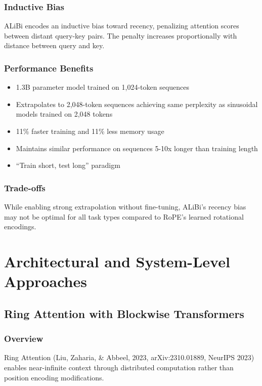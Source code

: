 \documentclass[11pt,letterpaper]{article}
\begin{document}
\subsubsection{Inductive Bias}
ALiBi encodes an inductive bias toward recency, penalizing attention scores between distant query-key pairs. The penalty increases proportionally with distance between query and key.

\subsubsection{Performance Benefits}
\begin{itemize}[leftmargin=*]
    \item 1.3B parameter model trained on 1,024-token sequences
    \item Extrapolates to 2,048-token sequences achieving same perplexity as sinusoidal models trained on 2,048 tokens
    \item 11\% faster training and 11\% less memory usage
    \item Maintains similar performance on sequences 5-10x longer than training length
    \item ``Train short, test long'' paradigm
\end{itemize}

\subsubsection{Trade-offs}
While enabling strong extrapolation without fine-tuning, ALiBi's recency bias may not be optimal for all task types compared to RoPE's learned rotational encodings.

\section{Architectural and System-Level Approaches}

\subsection{Ring Attention with Blockwise Transformers}

\subsubsection{Overview}
Ring Attention (Liu, Zaharia, \& Abbeel, 2023, arXiv:2310.01889, NeurIPS 2023) enables near-infinite context through distributed computation rather than position encoding modifications.
\end{document}
